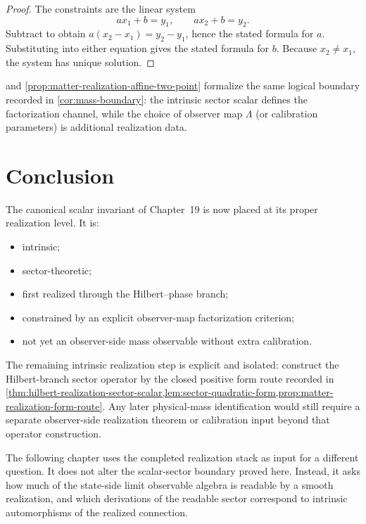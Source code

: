 \begin{proof}
The constraints are the linear system
\[
  ax_1+b=y_1,
  \qquad
  ax_2+b=y_2.
\]
Subtract to obtain
\(
  a(x_2-x_1)=y_2-y_1
\), hence the stated formula for \(a\).
Substituting into either equation gives the stated formula for \(b\).
Because \(x_2\neq x_1\), the system has unique solution.
\end{proof}

\begin{remark}
\label{rem:matter-realization-factorization-boundary}
 and
\cref{prop:matter-realization-affine-two-point} formalize the same logical
boundary recorded in \cref{cor:mass-boundary}:
the intrinsic sector scalar defines the factorization channel, while the
choice of observer map \(\Lambda\) (or calibration parameters) is additional
realization data.
\end{remark}

\section{Conclusion}
\label{sec:matter-realization-conclusion}

The canonical scalar invariant of Chapter~19 is now placed at its proper
realization level.
It is:
\begin{itemize}
\item intrinsic;
\item sector-theoretic;
\item first realized through the Hilbert--phase branch;
\item constrained by an explicit observer-map factorization criterion;
\item not yet an observer-side mass observable without extra calibration.
\end{itemize}

The remaining intrinsic realization step is explicit and isolated:
construct the Hilbert-branch sector operator by the closed positive
form route recorded in
\cref{thm:hilbert-realization-sector-scalar,lem:sector-quadratic-form,prop:matter-realization-form-route}.
Any later physical-mass identification would still require a separate
observer-side realization theorem or calibration input beyond that
operator construction.

The following chapter uses the completed realization stack as input for a
different question. It does not alter the scalar-sector boundary proved
here. Instead, it asks how much of the state-side limit observable
algebra is readable by a smooth realization, and which derivations of
the readable sector correspond to intrinsic automorphisms of the
realized connection.

